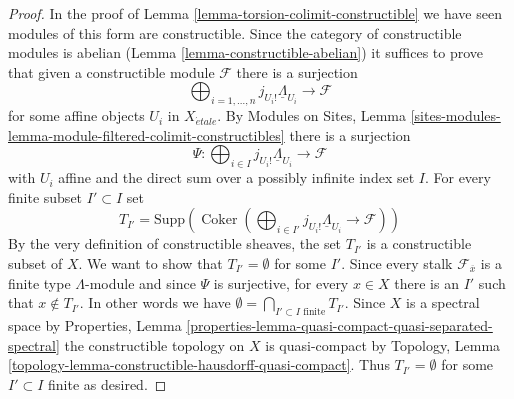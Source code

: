 \documentclass[10pt,a4paper]{amsart}
\theoremstyle{plain}
\theoremstyle{definition}
\theoremstyle{remark}
\numberwithin{equation}{subsection}
\def\etale{{\acute{e}tale}}
\def\Coker{\mathop{\mathrm{Coker}}}
\begin{document}
\begin{proof}
In the proof of Lemma \ref{lemma-torsion-colimit-constructible}
we have seen modules of this form are constructible. Since the
category of constructible modules is abelian
(Lemma \ref{lemma-constructible-abelian})
it suffices to prove that given a constructible module $\mathcal{F}$
there is a surjection
$$
\bigoplus\nolimits_{i = 1, \ldots, n} j_{U_i!}\underline{\Lambda}_{U_i}
\longrightarrow \mathcal{F}
$$
for some affine objects $U_i$ in $X_\etale$. By
Modules on Sites, Lemma
\ref{sites-modules-lemma-module-filtered-colimit-constructibles}
there is a surjection
$$
\Psi :
\bigoplus\nolimits_{i \in I} j_{U_i!}\underline{\Lambda}_{U_i}
\longrightarrow
\mathcal{F}
$$
with $U_i$ affine and the direct sum over a possibly infinite
index set $I$. For every finite subset $I' \subset I$ set
$$
T_{I'} = \text{Supp}(\Coker(
\bigoplus\nolimits_{i \in I'} j_{U_i!}\underline{\Lambda}_{U_i}
\longrightarrow \mathcal{F}))
$$
By the very definition of constructible sheaves, the set $T_{I'}$
is a constructible subset of $X$. We want to show that $T_{I'} = \emptyset$
for some $I'$. Since every stalk $\mathcal{F}_{\overline{x}}$ is
a finite type $\Lambda$-module and since $\Psi$ is surjective, for
every $x \in X$ there is an $I'$ such that $x \not \in T_{I'}$.
In other words we have
$\emptyset = \bigcap_{I' \subset I\text{ finite}} T_{I'}$. Since
$X$ is a spectral space by Properties, Lemma
\ref{properties-lemma-quasi-compact-quasi-separated-spectral}
the constructible topology on $X$ is quasi-compact by
Topology, Lemma \ref{topology-lemma-constructible-hausdorff-quasi-compact}.
Thus $T_{I'} = \emptyset$ for some $I' \subset I$ finite
as desired.
\end{proof}
\end{document}
